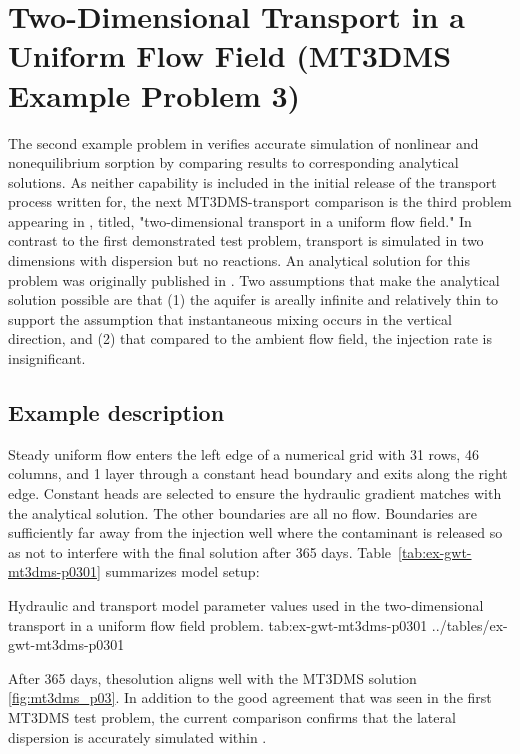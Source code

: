 \section{Two-Dimensional Transport in a Uniform Flow Field (MT3DMS Example Problem 3)}

The second example problem in \cite{zheng1999mt3dms} verifies accurate simulation of nonlinear and nonequilibrium sorption by comparing results to corresponding analytical solutions. As neither capability is included in the initial release of the transport process written for\mf, the next MT3DMS-\mf transport comparison is the third problem appearing in \cite{zheng1999mt3dms}, titled, "two-dimensional transport in a uniform flow field." In contrast to the first demonstrated test problem, transport is simulated in two dimensions with dispersion but no reactions. An analytical solution for this problem was originally published in \cite{wilson1978}. Two assumptions that make the analytical solution possible are that (1) the aquifer is areally infinite and relatively thin to support the assumption that instantaneous mixing occurs in the vertical direction, and (2) that compared to the ambient flow field, the injection rate is insignificant.  

\subsection{Example description}

Steady uniform flow enters the left edge of a numerical grid with 31 rows, 46 columns, and 1 layer through a constant head boundary and exits along the right edge. Constant heads are selected to ensure the hydraulic gradient matches with the analytical solution. The other boundaries are all no flow. Boundaries are sufficiently far away from the injection well where the contaminant is released so as not to interfere with the final solution after 365 days. Table~\ref{tab:ex-gwt-mt3dms-p0301} summarizes model setup:

\begin{StandardTable}
	{Hydraulic and transport model parameter values used in the two-dimensional transport in a uniform flow field problem.}
	{tab:ex-gwt-mt3dms-p0301}
	{../tables/ex-gwt-mt3dms-p0301}
\end{StandardTable}

After 365 days, the\mf solution aligns well with the MT3DMS solution \ref{fig:mt3dms_p03}. In addition to the good agreement that was seen in the first  MT3DMS test problem, the current comparison confirms that the lateral dispersion is accurately simulated within \mf.

